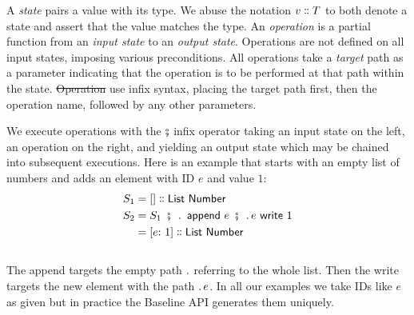 \documentclass[english,submission]{programming}
\theoremstyle{definition}
\newcommand{\mathbox}[1]{\colorbox{black!10}{$#1$\phantom{i\hspace{-3.5pt}}}}
\DeclareMathOperator{\exec}{\ \fatsemi\ \ }
\newcommand{\is}{{:}\ }
\newcommand{\isa}{\dblcolon}
\providecommand{\DIFadd}[1]{{\protect\color{blue}\uwave{#1}}} %
\providecommand{\DIFdel}[1]{{\protect\color{red}\sout{#1}}} %
\providecommand{\DIFaddbegin}{} %
\providecommand{\DIFaddend}{} %
\providecommand{\DIFdelbegin}{} %
\providecommand{\DIFdelend}{} %
\begin{document}
A \textit{state} pairs a value with its type. We abuse the notation \mathbox{v \isa T} to both denote a state and assert that the value matches the type.
An \textit{operation} is a partial function from an \textit{input state} to an \textit{output state}. Operations are not defined on all input states, imposing various preconditions.
All operations take a \textit{target} path as a parameter indicating that the operation is to be performed at that path within the state.
\DIFdelbegin \DIFdel{Operation }\DIFdelend \DIFaddbegin \DIFadd{Operations }\DIFaddend use infix syntax, placing the target path first, then the operation name, followed by any other parameters.




We execute operations with the \mathbox{\fatsemi} infix operator taking an input state on the left, an operation on the right, and yielding an output state which may be chained into subsequent executions. Here is an example that starts with an empty list of numbers and adds an element with ID $e$ and value $1$:
\begin{align*}
  S_1 &= [] \isa \textsf{List Number}\\
  S_2 &= S_1 \exec \ldotp \textsf{ append } e \exec \ldotp e \textsf{ write } 1\\
  &= [e \is 1] \isa \textsf{List Number}\\
\end{align*}
\vspace{-30pt}\\
The \textsf{append} targets the empty path \mathbox{\ldotp} referring to the whole list. Then the \textsf{write} targets the new element with the path \mathbox{\ldotp e}. In all our examples we take IDs like \mathbox{e} as given but in practice the Baseline API generates them uniquely.
\end{document}
